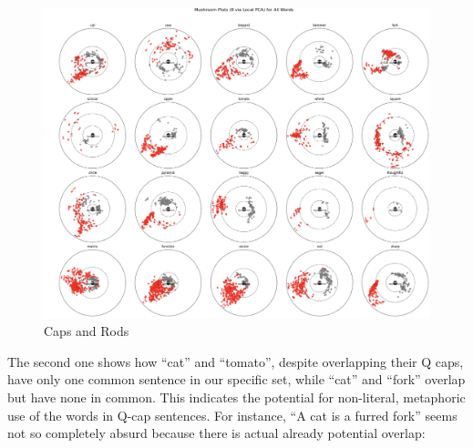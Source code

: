 \documentclass[12pt]{article}
\providecommand{\pandocbounded}[1]{#1}   %
\begin{document}
\begin{figure}
\centering
\pandocbounded{\includegraphics[keepaspectratio]{figures/rods_and_caps.png}}
\caption{Caps and Rods}
\end{figure}

The second one shows how ``cat'' and ``tomato'', despite overlapping their Q caps, have only one common sentence in our specific set, while ``cat'' and ``fork'' overlap but have none in common. This indicates the potential for non-literal, metaphoric use of the words in Q-cap sentences. For instance, ``A cat is a furred fork'' seems not so completely absurd because there is actual already potential overlap:
\end{document}
